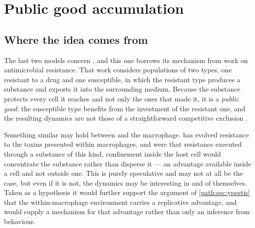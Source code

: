 
\section{Public good accumulation}
\label{var:sec:publicgood}

\subsection{Where the idea comes from}
\label{var:sec:publicgoodframing}

The last two models concern \yp{}, and this one borrows its mechanism from
work on antimicrobial resistance. That work considers populations of two
types, one resistant to a drug and one susceptible, in which the resistant
type produces a substance and exports it into the surrounding medium. Because
the substance protects every cell it reaches and not only the ones that made
it, it is a \emph{public good}: the susceptible type benefits from the
investment of the resistant one, and the resulting dynamics are not those of a
straightforward competitive exclusion \cite{asker2023coexistence}.

Something similar may hold between \yp{} and the macrophage. \yp{} has
evolved resistance to the toxins presented within macrophages, and were that
resistance executed through a substance of this kind, confinement inside the
host cell would concentrate the substance rather than disperse it --- an
advantage available inside a cell and not outside one. This is purely
speculative and may not at all be the case, but even if it is not, the
dynamics may be interesting in and of themselves. Taken as a hypothesis it
would further support the argument of \cref{path:sec:ypestis} that the
within-macrophage environment carries a replicative advantage, and would
supply a mechanism for that advantage rather than only an inference from
behaviour.

